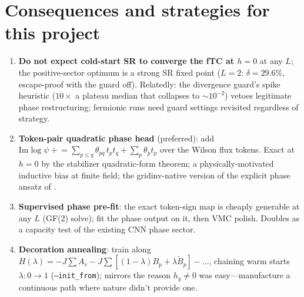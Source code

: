 \documentclass[11pt]{article}
\newcommand{\Av}{A_v}
\newcommand{\Bp}{B_p}
\newcommand{\Bt}{\tilde B_p}
\begin{document}
\section{Consequences and strategies for this project}

\begin{enumerate}
\item \textbf{Do not expect cold-start SR to converge the fTC at $h=0$} at any
$L$; the positive-sector optimum is a strong SR fixed point ($L=2$:
$\delta=29.6\%$, escape-proof with the guard off). Relatedly: the divergence
guard's spike heuristic ($10\times$ a plateau median that collapses to
$\sim10^{-2}$) vetoes legitimate phase restructuring; fermionic runs need
guard settings revisited regardless of strategy.
\item \textbf{Token-pair quadratic phase head} (preferred): add
$\mathrm{Im}\log\psi \mathrel{+}= \sum_{p\le q}\theta_{pq}\,t_p t_q
+\sum_p\theta_p t_p$ over the Wilson flux tokens. Exact at $h=0$ by the
stabilizer quadratic-form theorem; a physically-motivated inductive bias at
finite field; the gridinv-native version of the explicit phase ansatz of
\cite{SzaboCastelnovo2020}.
\item \textbf{Supervised phase pre-fit}: the exact token-sign map is cheaply
generable at any $L$ (GF(2) solve); fit the phase output on it, then VMC
polish. Doubles as a capacity test of the existing CNN phase sector.
\item \textbf{Decoration annealing}: train along
$H(\lambda)=-J\sum\Av-J\sum[(1-\lambda)\Bp+\lambda\Bt]-\dots$, chaining
warm starts $\lambda:0\to1$ (\texttt{--init\_from}); mirrors the reason
$h_y\neq0$ was easy---manufacture a continuous path where nature didn't
provide one.
\end{enumerate}
\end{document}
